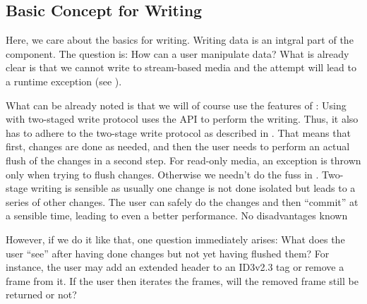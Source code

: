 \subsection{Basic Concept for Writing}%
\label{sec:BasicConceptforWriting}%

Here, we care about the basics for writing. Writing data is an intgral part of the \COMPdataPartManagement{} component. The question is: How can a user manipulate data? What is already clear is that we cannot write to stream-based media and the attempt will lead to a runtime exception (see ).

What can be already noted is that we will of course use the features of \COMPmedia{}:
{%
Using \COMPmedia{} with two-staged write protocol
}
{%
\COMPdataPartManagement{} uses the \COMPmedia{} API to perform the writing. Thus, it also has to adhere to the two-stage write protocol as described in . That means that first, changes are done as needed, and then the user needs to perform an actual flush of the changes in a second step. For read-only media, an exception is thrown only when trying to flush changes.
}
{%
Otherwise we needn't do the fuss in \COMPmedia{}. Two-stage writing is sensible as usually one change is not done isolated but leads to a series of other changes. The user can safely do the changes and then ``commit'' at a sensible time, leading to even a better performance.
}
{%
No disadvantages known
}

However, if we do it like that, one question immediately arises: What does the user ``see'' after having done changes but not yet having flushed them? For instance, the user may add an extended header to an ID3v2.3 tag or remove a frame from it. If the user then iterates the frames, will the removed frame still be returned or not? 

